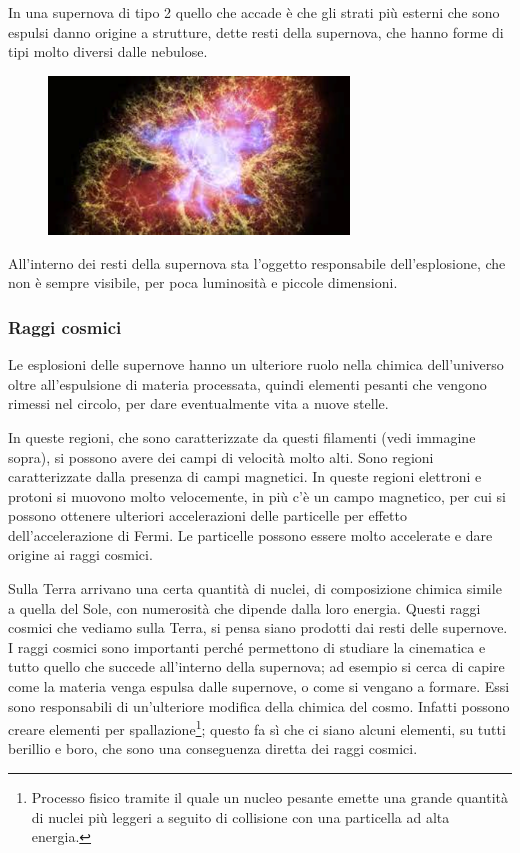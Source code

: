 In una supernova di tipo 2 quello che accade è che gli strati più esterni che sono espulsi danno origine a strutture, dette resti della supernova, che hanno forme di tipi molto diversi dalle nebulose.

\begin{figure}[H]
    \centering
    \includegraphics[width=8cm]{lezione 28 novembre/supernovarem1.png}
    \label{lezione 28 novembre/supernovarem1.png}
\end{figure}

All'interno dei resti della supernova sta l'oggetto responsabile dell'esplosione, che non è sempre visibile, per poca luminosità e piccole dimensioni.

\subsubsection{Raggi cosmici}
Le esplosioni delle supernove hanno un ulteriore ruolo nella chimica dell'universo oltre all'espulsione di materia processata, quindi elementi pesanti che vengono rimessi nel circolo, per dare eventualmente vita a nuove stelle.

In queste regioni, che sono caratterizzate da questi filamenti (vedi immagine sopra), si possono avere dei campi di velocità molto alti. Sono regioni caratterizzate dalla presenza di campi magnetici. In queste regioni elettroni e protoni si muovono molto velocemente, in più c'è un campo magnetico, per cui si possono ottenere ulteriori accelerazioni delle particelle per effetto dell'accelerazione di Fermi. Le particelle possono essere molto accelerate e dare origine ai raggi cosmici.

Sulla Terra arrivano una certa quantità di nuclei, di composizione chimica simile a quella del Sole, con numerosità che dipende dalla loro energia. Questi raggi cosmici che vediamo sulla Terra, si pensa siano prodotti dai resti delle supernove. I raggi cosmici sono importanti perché permettono di studiare la cinematica e tutto quello che succede all'interno della supernova; ad esempio si cerca di capire come la materia venga espulsa dalle supernove, o come si vengano a formare. Essi sono responsabili di un'ulteriore modifica della chimica del cosmo. Infatti possono creare elementi per spallazione\footnote{Processo fisico tramite il quale un nucleo pesante emette una grande quantità di nuclei più leggeri a seguito di collisione con una particella ad alta energia.}; questo fa sì che ci siano alcuni elementi, su tutti berillio e boro, che sono una conseguenza diretta dei raggi cosmici.
